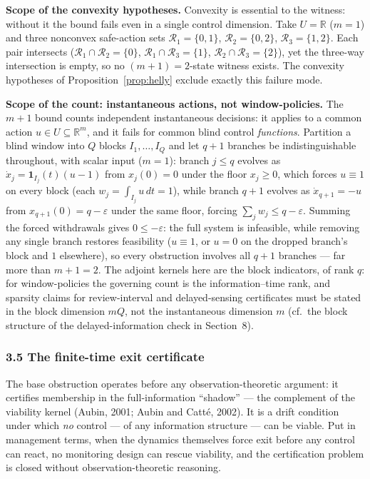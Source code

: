\documentclass[10pt,twocolumn]{article}
\theoremstyle{definition}
\begin{document}
\textbf{Scope of the convexity hypotheses.} Convexity is essential to the witness: without it the bound fails even in a single control dimension. Take \(U=\mathbb R\) (\(m=1\)) and three nonconvex safe-action sets \(\mathcal R_1=\{0,1\}\), \(\mathcal R_2=\{0,2\}\), \(\mathcal R_3=\{1,2\}\). Each pair intersects (\(\mathcal R_1\cap\mathcal R_2=\{0\}\), \(\mathcal R_1\cap\mathcal R_3=\{1\}\), \(\mathcal R_2\cap\mathcal R_3=\{2\}\)), yet the three-way intersection is empty, so no \((m+1)=2\)-state witness exists. The convexity hypotheses of Proposition~\ref{prop:helly} exclude exactly this failure mode.

\textbf{Scope of the count: instantaneous actions, not window-policies.}
The \(m+1\) bound counts independent instantaneous decisions: it applies to a
common action \(u \in U \subseteq \mathbb{R}^m\), and it fails for common blind
control \emph{functions}. Partition a blind window into \(Q\) blocks
\(I_1, \dots, I_Q\) and let \(q + 1\) branches be indistinguishable throughout,
with scalar input (\(m = 1\)): branch \(j \le q\) evolves as
\(\dot x_j = \mathbf{1}_{I_j}(t)(u - 1)\) from \(x_j(0) = 0\) under the floor
\(x_j \ge 0\), which forces \(u \equiv 1\) on every block (each
\(w_j = \int_{I_j} u \, dt = 1\)), while branch \(q+1\) evolves as
\(\dot x_{q+1} = -u\) from \(x_{q+1}(0) = q - \varepsilon\) under the same
floor, forcing \(\sum_j w_j \le q - \varepsilon\). Summing the forced
withdrawals gives \(0 \le -\varepsilon\): the full system is infeasible, while
removing any single branch restores feasibility (\(u \equiv 1\), or \(u = 0\)
on the dropped branch's block and \(1\) elsewhere), so every obstruction
involves all \(q+1\) branches --- far more than \(m + 1 = 2\). The adjoint
kernels here are the block indicators, of rank \(q\): for window-policies the
governing count is the information--time rank, and sparsity claims for
review-interval and delayed-sensing certificates must be stated in the block
dimension \(mQ\), not the instantaneous dimension \(m\) (cf.\ the block
structure of the delayed-information check in Section~8).

\subsubsection{3.5 The finite-time exit
certificate}\label{the-finite-time-exit-certificate}

The base obstruction operates before any observation-theoretic argument: it
certifies membership in the full-information ``shadow'' --- the
complement of the viability kernel (Aubin, 2001; Aubin and
Catt\'e, 2002).
It is a drift condition under which \emph{no} control --- of any
information structure --- can be viable. Put in management terms, when the dynamics themselves force exit before any control can react, no monitoring design can rescue viability, and the certification problem is closed without observation-theoretic reasoning.
\end{document}
